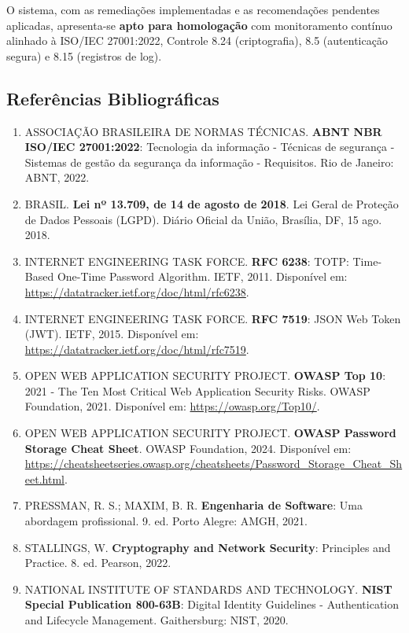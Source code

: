 \documentclass[11pt, a4paper]{article}
\begin{document}
O sistema, com as remediações implementadas e as recomendações pendentes aplicadas, apresenta-se \textbf{apto para homologação} com monitoramento contínuo alinhado à ISO/IEC 27001:2022, Controle 8.24 (criptografia), 8.5 (autenticação segura) e 8.15 (registros de log).

\subsection{Referências Bibliográficas}

\begin{enumerate}
  \item ASSOCIAÇÃO BRASILEIRA DE NORMAS TÉCNICAS. \textbf{ABNT NBR ISO/IEC 27001:2022}: Tecnologia da informação - Técnicas de segurança - Sistemas de gestão da segurança da informação - Requisitos. Rio de Janeiro: ABNT, 2022.

  \item BRASIL. \textbf{Lei nº 13.709, de 14 de agosto de 2018}. Lei Geral de Proteção de Dados Pessoais (LGPD). Diário Oficial da União, Brasília, DF, 15 ago. 2018.

  \item INTERNET ENGINEERING TASK FORCE. \textbf{RFC 6238}: TOTP: Time-Based One-Time Password Algorithm. IETF, 2011. Disponível em: \url{https://datatracker.ietf.org/doc/html/rfc6238}.

  \item INTERNET ENGINEERING TASK FORCE. \textbf{RFC 7519}: JSON Web Token (JWT). IETF, 2015. Disponível em: \url{https://datatracker.ietf.org/doc/html/rfc7519}.

  \item OPEN WEB APPLICATION SECURITY PROJECT. \textbf{OWASP Top 10}: 2021 - The Ten Most Critical Web Application Security Risks. OWASP Foundation, 2021. Disponível em: \url{https://owasp.org/Top10/}.

  \item OPEN WEB APPLICATION SECURITY PROJECT. \textbf{OWASP Password Storage Cheat Sheet}. OWASP Foundation, 2024. Disponível em: \url{https://cheatsheetseries.owasp.org/cheatsheets/Password_Storage_Cheat_Sheet.html}.

  \item PRESSMAN, R. S.; MAXIM, B. R. \textbf{Engenharia de Software}: Uma abordagem profissional. 9. ed. Porto Alegre: AMGH, 2021.

  \item STALLINGS, W. \textbf{Cryptography and Network Security}: Principles and Practice. 8. ed. Pearson, 2022.

  \item NATIONAL INSTITUTE OF STANDARDS AND TECHNOLOGY. \textbf{NIST Special Publication 800-63B}: Digital Identity Guidelines - Authentication and Lifecycle Management. Gaithersburg: NIST, 2020.
\end{enumerate}
\end{document}
